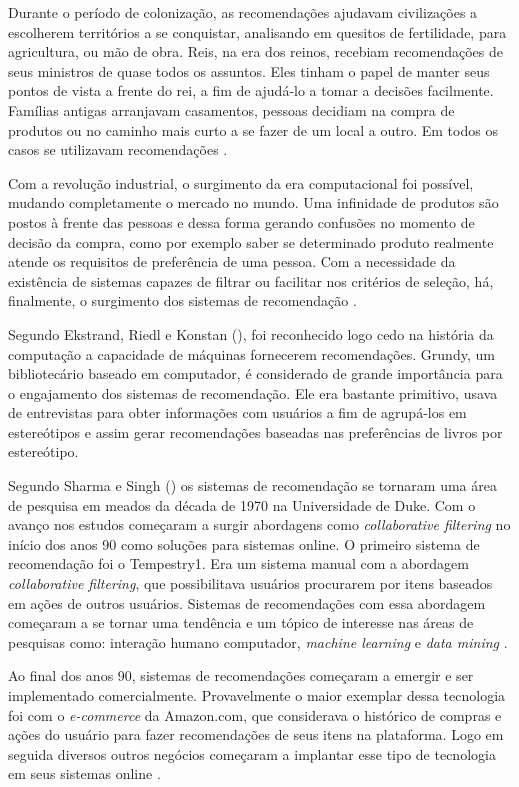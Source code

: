 Durante o período de colonização, as recomendações ajudavam civilizações a escolherem territórios a se conquistar, analisando em quesitos de fertilidade, para agricultura, ou mão de obra. Reis, na era dos reinos, recebiam recomendações de seus ministros de quase todos os assuntos. Eles tinham o papel de manter seus pontos de vista a frente do rei, a fim de ajudá-lo a tomar a decisões facilmente. Famílias antigas arranjavam casamentos, pessoas decidiam na compra de produtos ou no caminho mais curto a se fazer de um local a outro. Em todos os casos se utilizavam recomendações \cite{Sharma:2016}.

Com a revolução industrial, o surgimento da era computacional foi possível, mudando completamente o mercado no mundo. Uma infinidade de produtos são postos à frente das pessoas e dessa forma gerando confusões no momento de decisão da compra, como por exemplo saber se determinado produto realmente atende os requisitos de preferência de uma pessoa. Com a necessidade da existência de sistemas capazes de filtrar ou facilitar nos critérios de seleção, há, finalmente, o surgimento dos sistemas de recomendação \cite{Sharma:2016}.

Segundo Ekstrand, Riedl e Konstan (\citeyear{Ekstrand:2011:CFR:2185827.2185828}), foi reconhecido logo cedo na história da computação a capacidade de máquinas fornecerem recomendações. Grundy, um bibliotecário baseado em computador, é considerado de grande importância para o engajamento dos sistemas de recomendação. Ele era bastante primitivo, usava de entrevistas para obter informações com usuários a fim de agrupá-los em estereótipos e assim gerar recomendações  baseadas nas preferências de livros por estereótipo.

Segundo Sharma e Singh (\citeyear{Sharma:2016}) os sistemas de recomendação se tornaram uma área de pesquisa em meados da década de 1970 na Universidade de Duke. Com o avanço nos estudos começaram a surgir abordagens como \textit{collaborative filtering} no início dos anos 90 como soluções para sistemas online. O primeiro sistema de recomendação foi o Tempestry1. Era um sistema manual com a abordagem \textit{collaborative filtering}, que possibilitava usuários procurarem por itens baseados em ações de outros usuários. Sistemas de recomendações com essa abordagem começaram a se tornar uma tendência e um tópico de interesse nas áreas de pesquisas como: interação humano computador, \textit{machine learning} e \textit{data mining} \cite{Ekstrand:2011:CFR:2185827.2185828}. 

Ao final dos anos 90, sistemas de recomendações começaram a emergir e ser implementado comercialmente. Provavelmente o maior exemplar dessa tecnologia foi com o \textit{e-commerce} da Amazon.com, que considerava o histórico de compras e ações do usuário para fazer recomendações de seus itens na plataforma. Logo em seguida diversos outros negócios começaram a implantar esse tipo de tecnologia em seus sistemas online \cite{Ekstrand:2011:CFR:2185827.2185828}.

